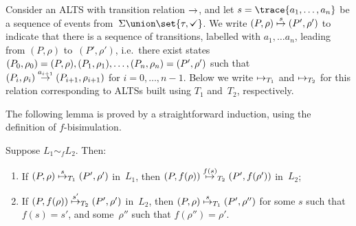Consider an ALTS with transition relation $\stackrel{}{\rightarrow}$, and let $s = \trace{a_1,
  \ldots, a_n}$ be a sequence of events from~$\Sigma \union \set{\tau,\tick}$.
We write $(P,\rho) \stackrel{s}{\mapsto} (P',\rho')$ to indicate that there is a sequence
of transitions, labelled with $a_1, \ldots a_n$, leading from $(P,\rho)$
to~$(P',\rho')$, i.e.~there exist states~$(P_0,\rho_0) =
(P,\rho),\linebreak[1] (P_1,\rho_1),\linebreak[1] \ldots,\linebreak[1]
(P_n,\rho_n) = (P',\rho')$ such that $(P_i,\rho_i) \stackrel{a_{i+1}}{\rightarrow}
(P_{i+1},\rho_{i+1})$ for $i = 0,\ldots,n-1$.  Below we write
$\stackrel{}{\mapsto}_{T_1}$ and $\stackrel{}{\mapsto}_{T_2}$ for this relation corresponding to
ALTSs built using $T_1$ and~$T_2$, respectively.

The following lemma is proved by a straightforward induction, using the
definition of $f$-bisimulation.
%
\begin{lemma}
Suppose $L_1 \sim_f L_2$.  Then:
%
\begin{enumerate}
\item If $(P,\rho) \stackrel{s}{\mapsto}_{T_1} (P',\rho')$ in~$L_1$, then $(P,f(\rho))
  \stackrel{f(s)}{\mapsto}_{T_2} (P',f(\rho'))$ in~$L_2$;  

\item If $(P,f(\rho)) \stackrel{s'}{\mapsto}_{T_2} (P',\rho')$ in~$L_2$, then $(P,\rho)
  \stackrel{s}{\mapsto}_{T_1} (P',\rho'')$ for some $s$ such that $f(s) = s'$, and
  some~$\rho''$ such that $f(\rho'') = \rho'$.
\end{enumerate}
\end{lemma}






